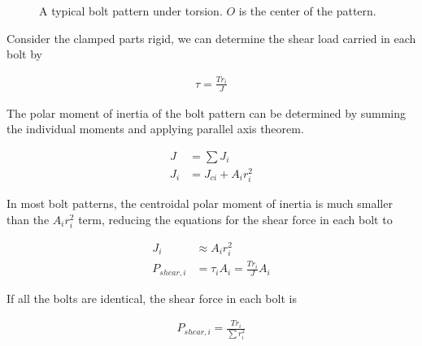 \documentclass[
10pt,
a4paper,
openany,
svgnames,
]{book}
\begin{document}
\begin{figure}[H]
  \centering
  \caption[Bolted Joint under Torsion]{A typical bolt pattern under torsion. $O$ is the center of the pattern.}
  \label{fig: bolts under torsion}
\end{figure}

Consider the clamped parts rigid, we can determine the shear load carried in each bolt by

\begin{align}
  \label{eq: bolt stress under torsion}
  \tau = \frac{Tr_i}{J} 
\end{align}

The polar moment of inertia of the bolt pattern can be determined by summing the individual moments and applying parallel axis theorem. 

\begin{align}
  J &= \sum J_i \\
  J_i &= J_{ci} + A_ir_i^2 
\end{align}

In most bolt patterns, the centroidal polar moment of inertia is much smaller than the $A_ir_i^2$ term, reducing the equations for the shear force in each bolt to

\begin{align}
  J_i &\approx A_ir_i^2 \\
  P_{shear, i} &= \tau_i A_i = \frac{T r_i}{J} A_i 
\end{align}

If all the bolts are identical, the shear force in each bolt is

\begin{align}
  \label{eq: force in bolt under torsion}
  P_{shear, i} = \frac{T r_i}{\sum r_i^2}
\end{align}
\end{document}
